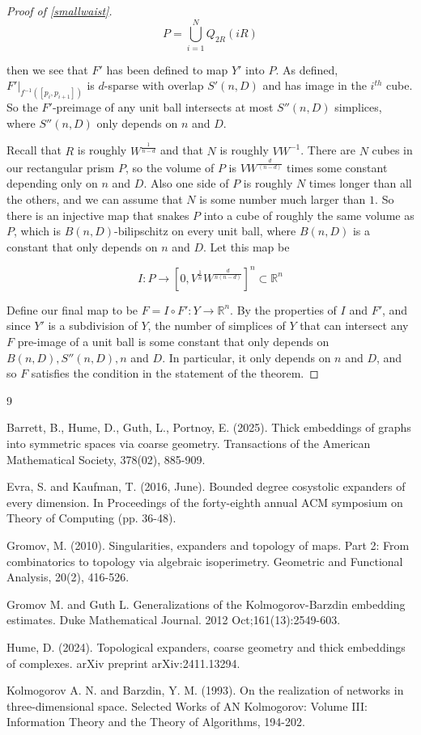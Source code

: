\documentclass[12pt]{article}
\newcommand{\RR}{\mathbb{R}}
\begin{document}
\begin{proof}[Proof of \cref{smallwaist}]
		$$P = \bigcup_{i=1}^N  Q_{2R}(iR)$$
		
		\noindent then we see that $F'$ has been defined to map $Y'$ into $P$. As defined, $F'|_{f^{-1}([p_i, p_{i+1}])}$ is $d$-sparse with overlap $S'(n,D)$ and has image in the $i^{th}$ cube. So the $F'$-preimage of any unit ball intersects at most $S''(n,D)$ simplices, where $S''(n,D)$ only depends on $n$ and $D$.
		
		Recall that $R$ is roughly $W^{\frac{1}{n-d}}$ and that $N$ is roughly $VW^{-1}$. There are $N$ cubes in our rectangular prism $P$, so the volume of $P$ is $VW^{\frac{d}{(n-d)}}$ times some constant depending only on $n$ and $D$. Also one side of $P$ is roughly $N$ times longer than all the others, and we can assume that $N$ is some number much larger than $1$. So there is an injective map that snakes $P$ into a cube of roughly the same volume as $P$, which is $B(n, D)$-bilipschitz on every unit ball, where $B(n, D)$ is a constant that only depends on $n$ and $D$. Let this map be
		
		$$I: P \to [0, V^{\frac{1}{n}}W^{\frac{d}{n(n-d)}}]^n \subset \RR^n$$
		
		\noindent Define our final map to be $F = I \circ F': Y \to \RR^n$. By the properties of $I$ and $F'$, and since $Y'$ is a subdivision of $Y$, the number of simplices of $Y$ that can intersect any $F$ pre-image of a unit ball is some constant that only depends on $B(n,D), S''(n,D), n$ and $D$. In particular, it only depends on $n$ and $D$, and so $F$ satisfies the condition in the statement of the theorem.
	\end{proof}
	
	\begin{thebibliography}{9}
		
		 Barrett, B., Hume, D., Guth, L., Portnoy, E. (2025). Thick embeddings of graphs into symmetric spaces via coarse geometry. Transactions of the American Mathematical Society, 378(02), 885-909.
		
		 Evra, S. and Kaufman, T. (2016, June). Bounded degree cosystolic expanders of every dimension. In Proceedings of the forty-eighth annual ACM symposium on Theory of Computing (pp. 36-48).
		
		 Gromov, M. (2010). Singularities, expanders and topology of maps. Part 2: From combinatorics to topology via algebraic isoperimetry. Geometric and Functional Analysis, 20(2), 416-526.
		
		 Gromov M. and Guth L. Generalizations of the Kolmogorov-Barzdin embedding estimates. Duke Mathematical Journal. 2012 Oct;161(13):2549-603.
		
		 Hume, D. (2024). Topological expanders, coarse geometry and thick embeddings of complexes. arXiv preprint arXiv:2411.13294.
		
		 Kolmogorov A. N. and Barzdin, Y. M. (1993). On the realization of networks in three-dimensional space. Selected Works of AN Kolmogorov: Volume III: Information Theory and the Theory of Algorithms, 194-202.
		
	\end{thebibliography}
	
	
\end{document}

